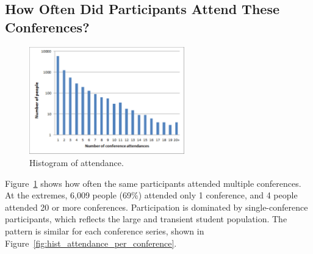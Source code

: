 \subsection{How Often Did Participants Attend These Conferences?}


\begin{figure}
  \centering
  \includegraphics[width=0.6\textwidth]{figs/AttendanceHist.pdf}
  \caption{Histogram of attendance.}
  \label{fig:hist_attendance}
\end{figure}

Figure~\ref{fig:hist_attendance} shows how often the same participants attended multiple conferences. At the extremes, 6,009 people (69\%) attended only 1 conference, and 4 people attended 20 or more conferences. Participation is dominated by single-conference participants, which reflects the large and transient student population. The pattern is similar for each conference series, shown in Figure~\ref{fig:hist_attendance_per_conference}.

